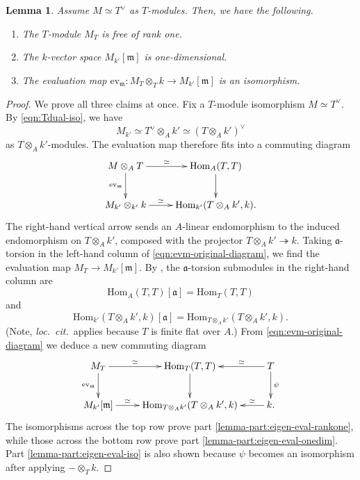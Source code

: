 \documentclass[10pt, twoside]{amsart}
\theoremstyle{plain}
\newtheorem{lemma}[theorem]{Lemma}
\theoremstyle{definition}
\theoremstyle{remark}
\numberwithin{equation}{subsection}
\def\Hom{\mathrm{Hom}}
\def\gm{\mathfrak m}
\def\ga{\mathfrak a}
\def\ev{\mathrm{ev}}
\begin{document}
\begin{lemma}\label{lemma:eigen-eval}
Assume $M \simeq T^\vee$ as $T$-modules. Then, we have the following.
\begin{enumerate}[label=(\roman*)]
\item The $T$-module $M_T$ is free of rank one.\label{lemma-part:eigen-eval-rankone}
\item The ${ k}$-vector space $M_{ k'}[\gm]$ is one-dimensional.\label{lemma-part:eigen-eval-onedim}
\item The evaluation map $\ev_{\gm}: M_T \otimes_T { k} \rightarrow M_{ k'}[\gm]$ is an isomorphism.\label{lemma-part:eigen-eval-iso}
\end{enumerate}
\end{lemma}
\begin{proof}
We prove all three claims at once. Fix a $T$-module isomorphism $M \simeq T^\vee$. By \eqref{eqn:Tdual-iso}, we have
$$
M_{ k'} \simeq T^\vee \otimes_A { k'} \simeq (T\otimes_A { k'})^\vee
$$
as $T\otimes_A { k'}$-modules. The evaluation map therefore fits into a commuting diagram
\begin{equation}\label{eqn:evm-original-diagram}
\xymatrix{
M \otimes_A T \ar[d]_-{\ev_{\gm}} \ar[r]^-{\simeq} & \Hom_A(T,T) \ar[d]\\
M_{ k'} \otimes_{ k'} { k} \ar[r]^-{\simeq} & \Hom_{ k'}(T\otimes_A { k'},{ k}).
}
\end{equation}
The right-hand vertical arrow sends an $A$-linear endomorphism to the induced endomorphism on $T\otimes_A { k'}$, composed with the projector $T\otimes_A { k'} \twoheadrightarrow { k}$. Taking $\ga$-torsion in the left-hand column of \eqref{eqn:evm-original-diagram}, we find the evaluation map $M_T \rightarrow M_{ k'}[\gm]$. By \cite[Proposition 9.1.6]{Bel}, the $\ga$-torsion submodules in the right-hand column are
$$
\Hom_A(T,T)[\ga] = \Hom_T(T,T)
$$
and
$$
\Hom_{ k'}(T\otimes_A { k'}, { k})[\ga] = \Hom_{T\otimes_A { k'}}(T\otimes_A { k'}, { k}).
$$
(Note, {\em loc.\ cit.}\ applies because $T$ is finite flat over $A$.) From \eqref{eqn:evm-original-diagram} we deduce a new commuting diagram
\begin{equation*}
\xymatrix{
M_T \ar[r]^-{\simeq} \ar[d]_-{\ev_{\gm}} & \Hom_T(T,T) \ar[d] & T \ar[d]^-{\psi} \ar[l]_-{\simeq} \\
M_{ k'}[\gm]\ar[r]^-{\simeq} & \Hom_{T\otimes_A { k'}}(T\otimes_A { k'},{ k})  & { k} \ar[l]_-{\simeq}.
}
\end{equation*}
The isomorphisms across the top row prove part \ref{lemma-part:eigen-eval-rankone}, while those across the bottom row prove part \ref{lemma-part:eigen-eval-onedim}. Part \ref{lemma-part:eigen-eval-iso} is also shown because $\psi$ becomes an isomorphism after applying $-\otimes_T { k}$.
\end{proof}
\end{document}
